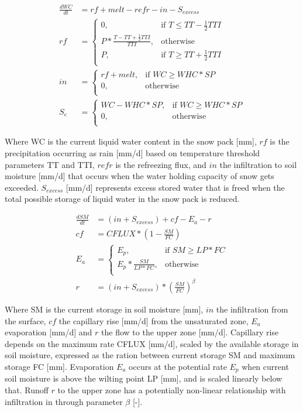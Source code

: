 \begin{align}
	\frac{dWC}{dt} &= rf+melt-refr-in-S_{excess}\\
	rf &= \begin{cases}
		0, &\text{if } T \leq TT-\frac{1}{2}TTI \\
		P*\frac{T- TT+\frac{1}{2}TTI}{TTI}, &\text{otherwise}\\
		P, &\text{if } T \geq TT+\frac{1}{2}TTI \\
	\end{cases} \\
	in &= \begin{cases}
		rf+melt, &\text{if } WC \geq WHC*SP\\
		0, &\text{otherwise}\\
	\end{cases}\\
	S_{e} &= \begin{cases}
		WC-WHC*SP, &\text{if } WC \geq WHC*SP\\
		0, &\text{otherwise}\\
	\end{cases}		
\end{align}

Where WC is the current liquid water content in the snow pack [mm], $rf$ is the precipitation occurring as rain [mm/d] based on temperature threshold parameters TT and TTI, $refr$ is the refreezing flux, and $in$ the infiltration to soil moisture [mm/d] that occurs when the water holding capacity of snow gets exceeded. $S_{excess}$ [mm/d] represents excess stored water that is freed when the total possible storage of liquid water in the snow pack is reduced.

\begin{align}
	\frac{dSM}{dt} &= (in+S_{excess})+cf-E_a-r\\
	cf &= CFLUX*\left(1-\frac{SM}{FC}\right)\\
	E_a &= \begin{cases}
		E_p, &\text{if } SM \geq LP*FC\\
		E_p*\frac{SM}{LP*FC}, &\text{otherwise}\\
	\end{cases}\\
	r &= (in+S_{excess})*\left(\frac{SM}{FC}\right)^\beta
\end{align}
  
Where SM is the current storage in soil moisture [mm], $in$ the infiltration from the surface, $cf$ the capillary rise [mm/d] from the unsaturated zone, $E_a$ evaporation [mm/d] and $r$ the flow to the upper zone [mm/d]. Capillary rise depends on the maximum rate CFLUX [mm/d], scaled by the available storage in soil moisture, expressed as the ration between current storage SM and maximum storage FC [mm]. Evaporation $E_a$ occurs at the potential rate $E_p$ when current soil moisture is above the wilting point LP [mm], and is scaled linearly below that. Runoff $r$ to the upper zone has a potentially non-linear relationship with infiltration in through parameter $\beta$ [-].

